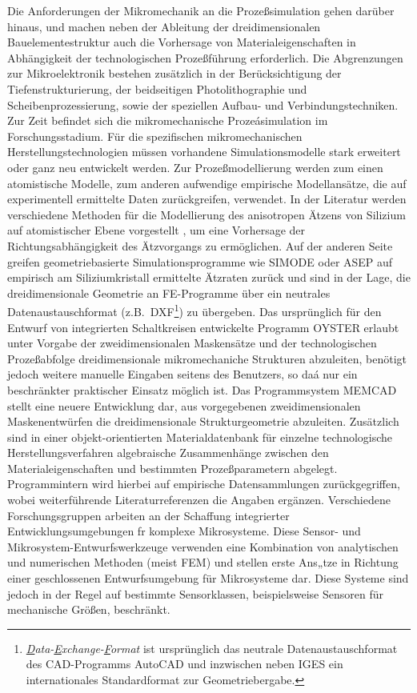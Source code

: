 Die Anforderungen der Mikromechanik an die Prozeßsimulation
gehen darüber hinaus, und machen neben der Ableitung der dreidimensionalen
Bauelementestruktur auch die Vorhersage von Materialeigenschaften in
Abhängigkeit der technologischen Prozeßführung erforderlich.
Die Abgrenzungen zur Mikroelektronik bestehen zusätzlich in
der Berücksichtigung der Tiefenstrukturierung, der beidseitigen
Photolithographie und Scheibenprozessierung, sowie der speziellen Aufbau-
und Verbindungstechniken. Zur Zeit befindet sich die mikromechanische
Prozeásimulation im Forschungsstadium. Für die spezifischen mikromechanischen
Herstellungstechnologien müssen vorhandene Simulationsmodelle stark
erweitert oder ganz neu entwickelt werden. Zur Prozeßmodellierung
werden zum einen atomistische Modelle, %
zum anderen
aufwendige empirische Modellansätze, die auf experimentell ermittelte
Daten zurückgreifen, verwendet. In der Literatur werden verschiedene
Methoden für die Modellierung des anisotropen Ätzens von Silizium
auf atomistischer Ebene vorgestellt \cite{Cam90, Tha94}, um eine Vorhersage
der Richtungsabhängigkeit des Ätzvorgangs zu ermöglichen. Auf der anderen
Seite greifen geometriebasierte Simulationsprogramme wie {\sf SIMODE}
\cite{Fru90} oder {\sf ASEP} \cite{Bus91b} auf empirisch am Siliziumkristall
ermittelte Ätzraten zurück und sind in der Lage, die dreidimensionale
Geometrie an FE-Programme über ein neutrales Datenaustauschformat
(z.B.\ {\sf DXF}\footnote{{\em
\underline{D}ata-\underline{E}xchange-\underline{F}ormat} ist ursprünglich
das neutrale Datenaustauschformat des CAD-Programms {\sf AutoCAD} und
inzwischen neben {\sf IGES} ein internationales Standardformat zur
Geometriebergabe.}) zu übergeben. Das ursprünglich für den
Entwurf von integrierten Schaltkreisen entwickelte Programm
{\sf OYSTER} \cite{Kop89} erlaubt unter Vorgabe der zweidimensionalen
Maskensätze und der technologischen Prozeßabfolge dreidimensionale
mikromechaniche Strukturen abzuleiten, benötigt jedoch weitere manuelle
Eingaben seitens des Benutzers, so daá nur ein beschränkter praktischer
Einsatz möglich ist. Das Programmsystem {\sf MEMCAD} \cite{Shu91, Sen92}
stellt eine neuere Entwicklung dar, aus
vorgegebenen zweidimensionalen Maskenentwürfen die dreidimensionale
Strukturgeometrie abzuleiten. Zusätzlich sind in einer
objekt-orientierten Materialdatenbank für einzelne technologische
Herstellungsverfahren algebraische Zusammenhänge zwischen den
Materialeigenschaften und bestimmten Prozeßparametern abgelegt.
Programmintern wird hierbei auf empirische Datensammlungen zurückgegriffen,
wobei weiterführende Literaturreferenzen die Angaben
ergänzen. Verschiedene Forschungsgruppen \cite{Cra91a, Joh91, San90}
arbeiten an der Schaffung integrierter Entwicklungsumgebungen fr
komplexe Mikrosysteme. Diese Sensor- und Mikrosystem-Entwurfswerkzeuge
verwenden eine Kombination von analytischen und numerischen Methoden
(meist FEM) und stellen erste Ans„tze in Richtung einer geschlossenen
Entwurfs\-umgebung für Mikrosysteme dar. Diese Systeme sind jedoch in
der Regel auf bestimmte Sensorklassen, beispielsweise Sensoren für
mechanische Größen, beschränkt.


